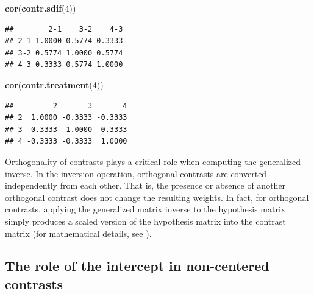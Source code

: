 \documentclass[12pt,]{krantz}
\newenvironment{Shaded}{\begin{snugshade}}{\end{snugshade}}
\newcommand{\DecValTok}[1]{\textcolor[rgb]{0.00,0.00,0.81}{#1}}
\newcommand{\KeywordTok}[1]{\textcolor[rgb]{0.13,0.29,0.53}{\textbf{#1}}}
\newcommand{\NormalTok}[1]{#1}
\begin{document}
\begin{Shaded}
\begin{Highlighting}[]
\KeywordTok{cor}\NormalTok{(}\KeywordTok{contr.sdif}\NormalTok{(}\DecValTok{4}\NormalTok{))}
\end{Highlighting}
\end{Shaded}

\begin{verbatim}
##        2-1    3-2    4-3
## 2-1 1.0000 0.5774 0.3333
## 3-2 0.5774 1.0000 0.5774
## 4-3 0.3333 0.5774 1.0000
\end{verbatim}

\begin{Shaded}
\begin{Highlighting}[]
\KeywordTok{cor}\NormalTok{(}\KeywordTok{contr.treatment}\NormalTok{(}\DecValTok{4}\NormalTok{))}
\end{Highlighting}
\end{Shaded}

\begin{verbatim}
##         2       3       4
## 2  1.0000 -0.3333 -0.3333
## 3 -0.3333  1.0000 -0.3333
## 4 -0.3333 -0.3333  1.0000
\end{verbatim}

Orthogonality of contrasts plays a critical role when computing the generalized inverse. In the inversion operation, orthogonal contrasts are converted independently from each other. That is, the presence or absence of another orthogonal contrast does not change the resulting weights. In fact, for orthogonal contrasts, applying the generalized matrix inverse to the hypothesis matrix simply produces a scaled version of the hypothesis matrix into the contrast matrix (for mathematical details, see \citet{schad2020capitalize}).

\hypertarget{the-role-of-the-intercept-in-non-centered-contrasts}{%
\subsection{The role of the intercept in non-centered contrasts}\label{the-role-of-the-intercept-in-non-centered-contrasts}}
\end{document}
